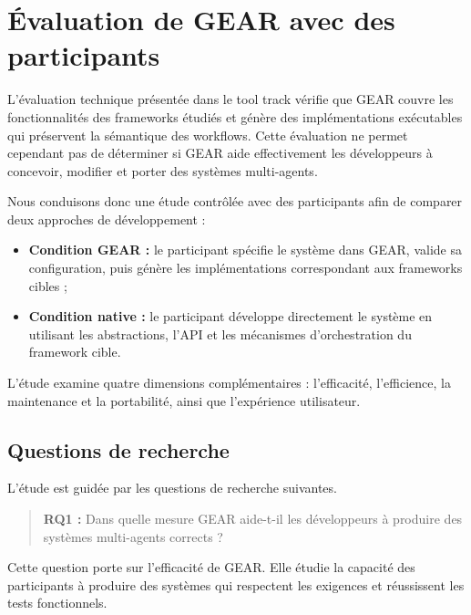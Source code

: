 
\section{Évaluation de GEAR avec des participants}
\label{sec:evaluation-participants}

L'évaluation technique présentée dans le tool track vérifie que GEAR
couvre les fonctionnalités des frameworks étudiés et génère des
implémentations exécutables qui préservent la sémantique des workflows.
Cette évaluation ne permet cependant pas de déterminer si GEAR aide
effectivement les développeurs à concevoir, modifier et porter des
systèmes multi-agents.

Nous conduisons donc une étude contrôlée avec des participants afin de
comparer deux approches de développement :

\begin{itemize}
    \item \textbf{Condition GEAR :} le participant spécifie le système
    dans GEAR, valide sa configuration, puis génère les implémentations
    correspondant aux frameworks cibles ;

    \item \textbf{Condition native :} le participant développe
    directement le système en utilisant les abstractions, l'API et les
    mécanismes d'orchestration du framework cible.
\end{itemize}

L'étude examine quatre dimensions complémentaires : l'efficacité,
l'efficience, la maintenance et la portabilité, ainsi que l'expérience
utilisateur.


\subsection{Questions de recherche}
\label{subsec:questions-recherche-participants}

L'étude est guidée par les questions de recherche suivantes.

\begin{quote}
\textbf{RQ1 :} Dans quelle mesure GEAR aide-t-il les développeurs à
produire des systèmes multi-agents corrects ?
\end{quote}

Cette question porte sur l'efficacité de GEAR. Elle étudie la capacité
des participants à produire des systèmes qui respectent les exigences
et réussissent les tests fonctionnels.


